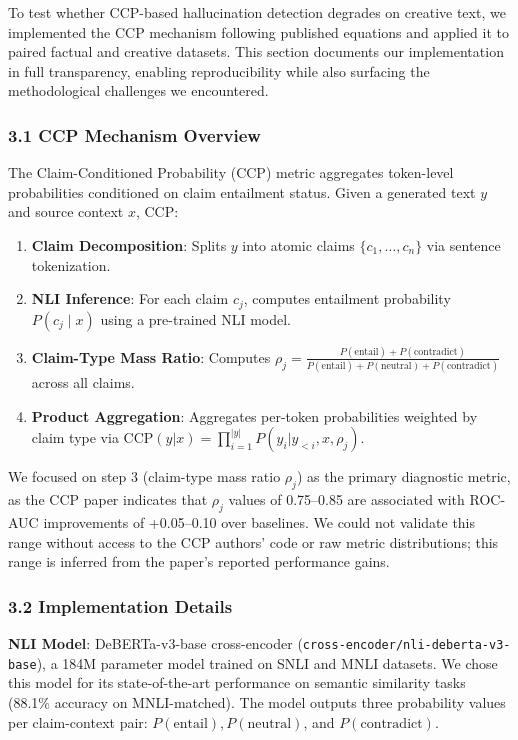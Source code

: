 
To test whether CCP-based hallucination detection degrades on creative text, we implemented the CCP mechanism following published equations and applied it to paired factual and creative datasets. This section documents our implementation in full transparency, enabling reproducibility while also surfacing the methodological challenges we encountered.

\subsubsection{3.1 CCP Mechanism Overview}

The Claim-Conditioned Probability (CCP) metric aggregates token-level probabilities conditioned on claim entailment status. Given a generated text $y$ and source context $x$, CCP:

\begin{enumerate}
\item \textbf{Claim Decomposition}: Splits $y$ into atomic claims $\{c_1, \ldots, c_n\}$ via sentence tokenization.
\item \textbf{NLI Inference}: For each claim $c_j$, computes entailment probability $P(c_j \mid x)$ using a pre-trained NLI model.
\item \textbf{Claim-Type Mass Ratio}: Computes $\rho_j = \frac{P(\text{entail}) + P(\text{contradict})}{P(\text{entail}) + P(\text{neutral}) + P(\text{contradict})}$ across all claims.
\item \textbf{Product Aggregation}: Aggregates per-token probabilities weighted by claim type via $\text{CCP}(y|x) = \prod_{i=1}^{|y|} P(y_i | y_{<i}, x, \rho_j)$.
\end{enumerate}

We focused on step 3 (claim-type mass ratio $\rho_j$) as the primary diagnostic metric, as the CCP paper indicates that $\rho_j$ values of 0.75--0.85 are associated with ROC-AUC improvements of +0.05--0.10 over baselines. We could not validate this range without access to the CCP authors' code or raw metric distributions; this range is inferred from the paper's reported performance gains.

\subsubsection{3.2 Implementation Details}

\textbf{NLI Model}: DeBERTa-v3-base cross-encoder (\texttt{cross-encoder/nli-deberta-v3-base}), a 184M parameter model trained on SNLI and MNLI datasets. We chose this model for its state-of-the-art performance on semantic similarity tasks (88.1\% accuracy on MNLI-matched). The model outputs three probability values per claim-context pair: $P(\text{entail}), P(\text{neutral})$, and $P(\text{contradict})$.

